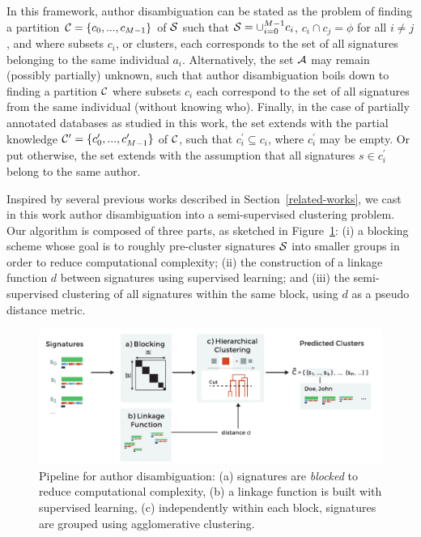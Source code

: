 \documentclass{article}
\begin{document}
In this
framework, author disambiguation can be stated as the problem of
finding a partition ${\cal C} = \{ c_0, ..., c_{M-1} \}$ of ${\cal S}$ such
that ${\cal S} = \cup_{i=0}^{M-1} c_i$, $c_i \cap c_j = \phi$ for all $i \neq
j$, and where subsets $c_i$, or clusters, each corresponds to the set of all
signatures belonging to the same individual $a_i$. Alternatively, the set
${\cal A}$ may remain (possibly partially) unknown, such that author
disambiguation boils down to finding a partition ${\cal C}$ where
subsets $c_i$  each correspond to the set of all signatures from the same
individual (without knowing who). Finally, in the case of partially annotated databases as studied in
this work, the set extends with the partial knowledge ${\cal C}^\prime = \{ c_0^\prime, ..., c_{M-1}^\prime \}$ of ${\cal C}$,
such that $c_i^\prime \subseteq c_i$, where $c_i^\prime$ may be empty.
Or put otherwise, the set extends with the assumption that all signatures
$s \in c_i^\prime$ belong to the same author.

Inspired by several previous works described in Section~\ref{related-works},
we cast in this work author disambiguation into a semi-supervised clustering
problem.
Our algorithm is composed of three parts, as sketched in Figure~\ref{fig:workflow}: (i) a blocking
scheme whose goal is to roughly pre-cluster signatures ${\cal S}$ into smaller groups in order to
reduce computational complexity; (ii) the construction of a linkage function
$d$ between signatures using supervised learning; and (iii) the
semi-supervised clustering of all signatures within the same block, using $d$ as a pseudo distance metric.


\begin{figure}
\centering
\includegraphics[width=\textwidth]{figures/workflow}
\caption{Pipeline for author disambiguation: (a)
signatures are \textit{blocked} to reduce computational complexity, (b) a linkage
function is built with supervised learning, (c) independently within each block, signatures
are grouped using agglomerative clustering.}
\label{fig:workflow}
\end{figure}
\end{document}
